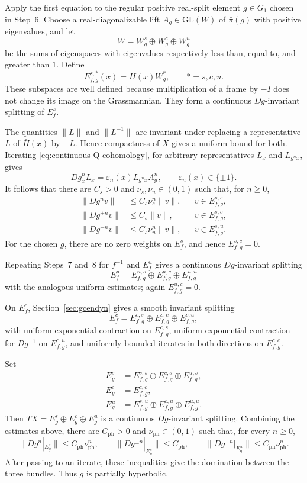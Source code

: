 \documentclass[11pt]{amsart}
\numberwithin{equation}{section}
\newcommand{\GL}{\mathrm{GL}}
\theoremstyle{plain}
\begin{document}
Apply the first equation to the regular positive real-split element
$g\in G_1$ chosen in Step~6. Choose a real-diagonalizable lift
$A_g\in\GL(W)$ of $\bar\pi(g)$ with positive eigenvalues, and let
\[
W=W_g^s\oplus W_g^c\oplus W_g^u
\]
be the sums of eigenspaces with eigenvalues respectively less than,
equal to, and greater than $1$. Define
\[
E^{s,*}_{f,g}(x)=\bar H(x)W_g^*,
\qquad *=s,c,u.
\]
These subspaces are well defined because multiplication of a frame by
$-I$ does not change its image on the Grassmannian. They form a
continuous $Dg$-invariant splitting of $E_f^s$.

The quantities $\|L\|$ and $\|L^{-1}\|$ are invariant under replacing
a representative $L$ of $\bar H(x)$ by $-L$. Hence compactness of
$X$ gives a uniform bound for both. Iterating
\eqref{eq:continuous-Q-cohomology}, for arbitrary representatives
$L_x$ and $L_{g^nx}$, gives
\[
Dg_x^nL_x=\varepsilon_n(x)L_{g^nx}A_g^n,
\qquad \varepsilon_n(x)\in\{\pm1\}.
\]
It follows that there are $C_s>0$ and
$\nu_s,\nu_u\in(0,1)$ such that, for $n\ge0$,
\[
\begin{aligned}
\|Dg^nv\|&\le C_s\nu_s^n\|v\|,
 &&v\in E^{s,s}_{f,g},\\
\|Dg^{\pm n}v\|&\le C_s\|v\|,
 &&v\in E^{s,c}_{f,g},\\
\|Dg^{-n}v\|&\le C_s\nu_u^n\|v\|,
 &&v\in E^{s,u}_{f,g}.
\end{aligned}
\]
For the chosen $g$, there are no zero weights on $E_f^s$, and hence
$E^{s,c}_{f,g}=0$.

Repeating Steps~7 and~8 for $f^{-1}$ and $E_f^u$ gives a continuous
$Dg$-invariant splitting
\[
E_f^u=E^{u,s}_{f,g}\oplus E^{u,c}_{f,g}\oplus E^{u,u}_{f,g}
\]
with the analogous uniform estimates; again
$E^{u,c}_{f,g}=0$.

On $E_f^c$, Section~\ref{sec:gcendyn} gives a smooth invariant
splitting
\[
E_f^c=E^{c,s}_{f,g}\oplus E^{c,c}_{f,g}\oplus E^{c,u}_{f,g},
\]
with uniform exponential contraction on $E^{c,s}_{f,g}$, uniform
exponential contraction for $Dg^{-1}$ on $E^{c,u}_{f,g}$, and
uniformly bounded iterates in both directions on
$E^{c,c}_{f,g}$.

Set
\[
\begin{aligned}
E_g^s&=E^{s,s}_{f,g}\oplus E^{c,s}_{f,g}
       \oplus E^{u,s}_{f,g},\\
E_g^c&=E^{c,c}_{f,g},\\
E_g^u&=E^{s,u}_{f,g}\oplus E^{c,u}_{f,g}
       \oplus E^{u,u}_{f,g}.
\end{aligned}
\]
Then $TX=E_g^s\oplus E_g^c\oplus E_g^u$ is a continuous
$Dg$-invariant splitting. Combining the estimates above, there are
$C_{\mathrm{ph}}>0$ and $\nu_{\mathrm{ph}}\in(0,1)$ such that, for every $n\ge0$,
\[
\|Dg^n|_{E_g^s}\|\le C_{\mathrm{ph}}\nu_{\mathrm{ph}}^n,\qquad
\|Dg^{\pm n}|_{E_g^c}\|\le C_{\mathrm{ph}},\qquad
\|Dg^{-n}|_{E_g^u}\|\le C_{\mathrm{ph}}\nu_{\mathrm{ph}}^n.
\]
After passing to an iterate, these inequalities give the domination
between the three bundles. Thus $g$ is partially hyperbolic.
\end{document}
